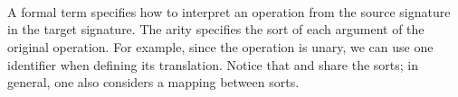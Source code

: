 \begin{code}
\>[0][@{}l@{\AgdaIndent{0}}]%
\>[1]\AgdaSpace{}%
%
\>[11]\AgdaSymbol{(}\AgdaSpace{}%
\AgdaSymbol{:}\AgdaSpace{}%
\AgdaSpace{}%
\AgdaSymbol{)}\AgdaSpace{}%
\AgdaSymbol{:}\AgdaSpace{}%
\AgdaSymbol{(}\AgdaSpace{}%
\AgdaSymbol{)}\AgdaSpace{}%
\AgdaSpace{}%
\AgdaSpace{}%
\<%
\\
\>[1][@{}l@{\AgdaIndent{0}}]%
\>[3]\AgdaInductiveConstructor{\#}%
\>[7]\AgdaSymbol{:}\AgdaSpace{}%
\AgdaSymbol{(}\AgdaSpace{}%
\AgdaSymbol{:}\AgdaSpace{}%
\AgdaSpace{}%
\AgdaSymbol{(}\AgdaSpace{}%
\AgdaSymbol{))}\AgdaSpace{}%
\AgdaSpace{}%
\AgdaSpace{}%
\AgdaSpace{}%
\AgdaSymbol{(}\AgdaSpace{}%
\AgdaSpace{}%
\AgdaSymbol{)}\<%
\\
%
\>[3]\AgdaSpace{}%
\AgdaSymbol{:}\AgdaSpace{}%
%
\>[113I]\AgdaSymbol{\{}\AgdaSpace{}%
\AgdaSymbol{\}}\AgdaSpace{}%
\AgdaSpace{}%
\AgdaSpace{}%
\AgdaSpace{}%
\AgdaSymbol{(}\AgdaSpace{}%
\AgdaOperator{\AgdaInductiveConstructor{,}}\AgdaSpace{}%
\AgdaSymbol{)}\AgdaSpace{}%
\<%
\\
\>[113I][@{}l@{\AgdaIndent{0}}]%
\>[15]\AgdaSpace{}%
\AgdaSymbol{(}\AgdaSpace{}%
\AgdaSymbol{)}\AgdaSpace{}%
\AgdaSpace{}%
\AgdaSpace{}%
\AgdaSpace{}%
\AgdaSpace{}%
\<%
\end{code}

A formal term specifies how to interpret an operation from the source
signature in the target signature. The arity  specifies the sort
of each argument of the original operation. For example, since the
operation  is unary, we can use one identifier
when defining its translation. Notice that  and
 share the sorts; in general, one also considers a
mapping between sorts.

